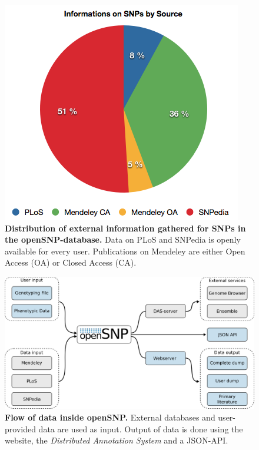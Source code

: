 \documentclass[10pt]{article}
\begin{document}
\begin{figure}[!ht]
	\begin{center}
		\includegraphics[scale=0.50]{paper_distribution.png}
	\end{center}
	\caption{
	{\bf Distribution of external information gathered for SNPs in the openSNP-database.} Data on PLoS and SNPedia is openly available for every user. Publications on Mendeley are either Open Access (OA) or Closed Access (CA).} 
	\label{Figure3_label}
\end{figure}

\begin{figure}[!ht]
	\begin{center}
		\includegraphics[scale=0.60]{uml_diagram.png}
	\end{center}
	\caption{
	{\bf Flow of data inside openSNP.} External databases and user-provided data are used as input. Output of data is done using the website, the \emph{Distributed Annotation System} and a JSON-API.} 
	\label{Figure4_label}
\end{figure}
\end{document}
